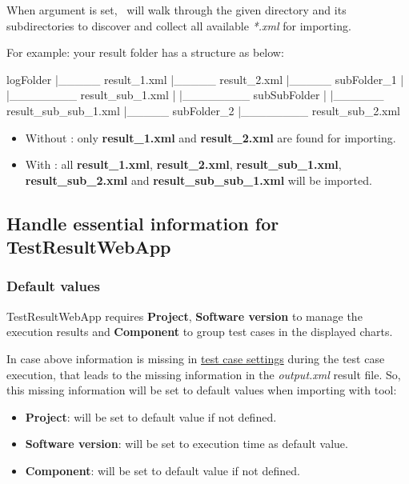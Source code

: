     When  argument is set, \pkg\ will walk through the given 
    directory and its subdirectories to discover and collect all available 
    \emph{*.xml} for importing.
    
    For example: your result folder has a structure as below:
    
\begin{robotlog}
logFolder
  |_____ result_1.xml
  |_____ result_2.xml
  |_____ subFolder_1
  |         |________ result_sub_1.xml
  |         |________ subSubFolder
  |                       |______ result_sub_sub_1.xml
  |_____ subFolder_2
            |________ result_sub_2.xml
\end{robotlog}
    
    \begin{itemize}
    \tightlist
    \item
      Without : only \textbf{result\_1.xml} and
      \textbf{result\_2.xml} are found for importing.
    \item
      With : all \textbf{result\_1.xml},
      \textbf{result\_2.xml}, \textbf{result\_sub\_1.xml},
      \textbf{result\_sub\_2.xml} and \textbf{result\_sub\_sub\_1.xml} will
      be imported.
    \end{itemize}

  \hypertarget{handle-required-information}{%
  \subsection{Handle essential information for TestResultWebApp}
  \label{handle-essential-information}}
    \subsubsection{Default values}
      TestResultWebApp requires \textbf{Project}, \textbf{Software version} to manage 
      the execution results and \textbf{Component} to group test cases in the 
      displayed charts.
      
      In case above information is missing in 
      \hyperref[description-robotframework-testcase-settings]{test case settings} 
      during the test case execution, that leads to the missing information in 
      the \emph{output.xml} result file.
      So, this missing information will be set to default values when importing with
      \href{https://github.com/test-fullautomation/robotframework-robotlog2db}
      {\pkg} tool:
      \begin{itemize}
        \tightlist
        \item \textbf{Project}: will be set to default value  
              if not defined.
        
        \item \textbf{Software version}: will be set to execution time 
               as default value.
        
        \item \textbf{Component}: will be set to default value  
              if not defined.
      \end{itemize}

